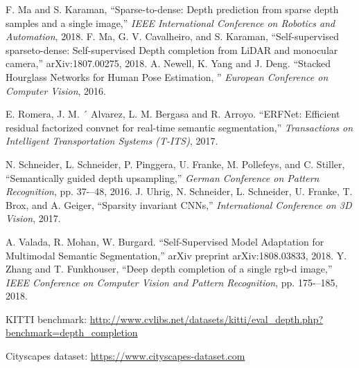 \documentclass{main_style}
\begin{document}
\begin{thebibliography}{99}
F. Ma and S. Karaman, ``Sparse-to-dense: Depth prediction from
sparse depth samples and a single image,'' \textit{IEEE International
Conference on Robotics and Automation}, 2018.
F. Ma, G. V. Cavalheiro, and S. Karaman, ``Self-supervised sparseto-dense:
Self-supervised Depth completion from LiDAR and monocular camera,” arXiv:1807.00275, 2018.
A. Newell, K. Yang and J. Deng.
``Stacked Hourglass Networks for Human Pose Estimation, '' \textit{European Conference on Computer Vision}, 2016.

E. Romera, J. M. ´ Alvarez, L. M. Bergasa and R. Arroyo.
``ERFNet: Efficient residual factorized convnet for
real-time semantic segmentation,'' \textit{Transactions on Intelligent Transportation Systems (T-ITS)}, 2017.

N. Schneider, L. Schneider, P. Pinggera, U. Franke, M. Pollefeys,
and C. Stiller, ``Semantically guided depth upsampling,'' \textit{German
Conference on Pattern Recognition}, pp. 37-–48, 2016.
  J. Uhrig, N. Schneider, L. Schneider, U. Franke, T. Brox, and A. Geiger, ``Sparsity invariant CNNs,'' \textit{International Conference on 3D Vision}, 2017.

A. Valada, R. Mohan, W. Burgard.
``Self-Supervised Model Adaptation for Multimodal Semantic Segmentation,''
arXiv preprint arXiv:1808.03833, 2018.  
Y. Zhang and T. Funkhouser, ``Deep depth completion of a single
rgb-d image,'' \textit{IEEE Conference on Computer Vision and Pattern
Recognition}, pp. 175-–185, 2018.

  KITTI benchmark: \url{ http://www.cvlibs.net/datasets/kitti/eval_depth.php?benchmark=depth_completion}
  
  Cityscapes dataset: \url{https://www.cityscapes-dataset.com}


















\end{thebibliography}
\end{document}
